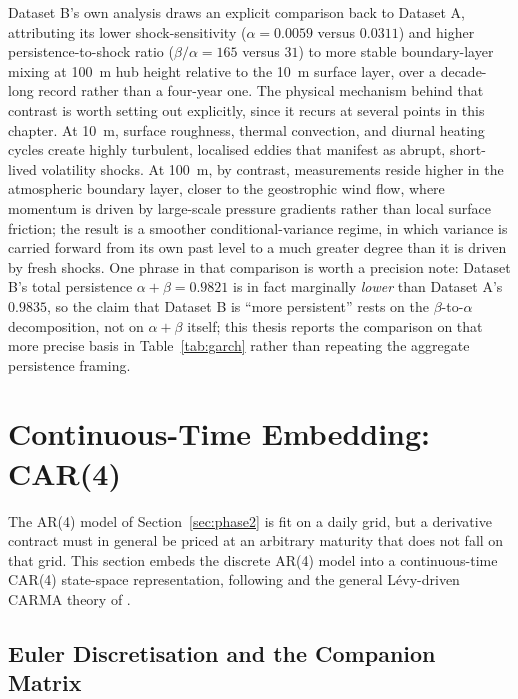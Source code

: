 \documentclass[11pt, a4paper, twoside]{article}
\begin{document}
Dataset B's own analysis draws an explicit comparison back to Dataset A, attributing its lower shock-sensitivity ($\alpha = 0.0059$ versus $0.0311$) and higher persistence-to-shock ratio ($\beta/\alpha = 165$ versus $31$) to more stable boundary-layer mixing at 100~m hub height relative to the 10~m surface layer, over a decade-long record rather than a four-year one. The physical mechanism behind that contrast is worth setting out explicitly, since it recurs at several points in this chapter. At 10~m, surface roughness, thermal convection, and diurnal heating cycles create highly turbulent, localised eddies that manifest as abrupt, short-lived volatility shocks. At 100~m, by contrast, measurements reside higher in the atmospheric boundary layer, closer to the geostrophic wind flow, where momentum is driven by large-scale pressure gradients rather than local surface friction; the result is a smoother conditional-variance regime, in which variance is carried forward from its own past level to a much greater degree than it is driven by fresh shocks. One phrase in that comparison is worth a precision note: Dataset B's total persistence $\alpha+\beta = 0.9821$ is in fact marginally \emph{lower} than Dataset A's $0.9835$, so the claim that Dataset B is ``more persistent'' rests on the $\beta$-to-$\alpha$ decomposition, not on $\alpha+\beta$ itself; this thesis reports the comparison on that more precise basis in Table~\ref{tab:garch} rather than repeating the aggregate persistence framing.

\section{Continuous-Time Embedding: CAR(4)}
\label{sec:phase4}

The AR(4) model of Section~\ref{sec:phase2} is fit on a daily grid, but a derivative contract must in general be priced at an arbitrary maturity that does not fall on that grid. This section embeds the discrete AR(4) model into a continuous-time CAR(4) state-space representation, following \citet{BenthSaltyteBenth2009} and the general Lévy-driven CARMA theory of \citet{BrockwellMarquardt2005}.

\subsection{Euler Discretisation and the Companion Matrix}
\label{sec:phase4-euler}
\end{document}
